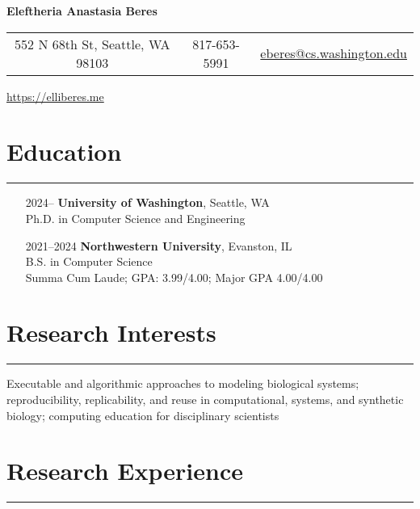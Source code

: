 \documentclass{article}
\begin{document}

\begin{center}
    \textbf{\huge{Eleftheria Anastasia Beres}}

    \vspace{10pt}

    \begin{tabular}{c c c}
        552 N 68th St, Seattle, WA 98103 & 817-653-5991 & \href{mailto:eberes@cs.washington.edu}{eberes@cs.washington.edu}
    \end{tabular}

    \vspace{5pt}

    \href{https://elliberes.me}{https://elliberes.me}
    
\end{center}

\section*{Education}
\hrule
\vspace{10pt}

\begin{itemize}[leftmargin=1.5in]
    \item[2024–] \textbf{University of Washington}, Seattle, WA\\
    Ph.D. in Computer Science and Engineering
    \item[2021–2024] \textbf{Northwestern University}, Evanston, IL\\
    B.S. in Computer Science\\
    Summa Cum Laude; GPA: 3.99/4.00; Major GPA 4.00/4.00
\end{itemize}

\section*{Research Interests}
\hrule
\vspace{10pt}

Executable and algorithmic approaches to modeling biological systems; reproducibility, replicability, and reuse in computational, systems, and synthetic biology; computing education for disciplinary scientists

\section*{Research Experience}
\hrule
\vspace{10pt}
\end{document}
